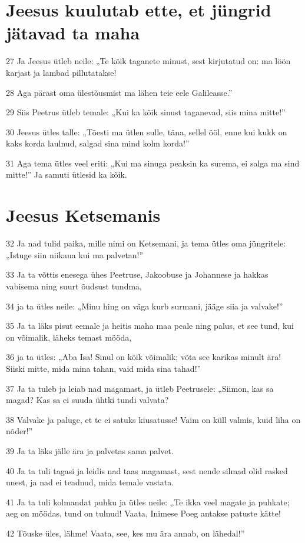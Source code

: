 \section*{Jeesus kuulutab ette, et jüngrid jätavad ta maha}

\par 27 Ja Jeesus ütleb neile: „Te kõik taganete minust, sest kirjutatud on: ma löön karjast ja lambad pillutatakse!
\par 28 Aga pärast oma ülestõusmist ma lähen teie eele Galileasse.”
\par 29 Siis Peetrus ütleb temale: „Kui ka kõik sinust taganevad, siis mina mitte!”
\par 30 Jeesus ütles talle: „Tõesti ma ütlen sulle, täna, sellel ööl, enne kui kukk on kaks korda laulnud, salgad sina mind kolm korda!”
\par 31 Aga tema ütles veel eriti: „Kui ma sinuga peaksin ka surema, ei salga ma sind mitte!” Ja samuti ütlesid ka kõik.

\section*{Jeesus Ketsemanis}

\par 32 Ja nad tulid paika, mille nimi on Ketsemani, ja tema ütles oma jüngritele: „Istuge siin niikaua kui ma palvetan!”
\par 33 Ja ta võttis enesega ühes Peetruse, Jakoobuse ja Johannese ja hakkas vabisema ning suurt õudsust tundma,
\par 34 ja ta ütles neile: „Minu hing on väga kurb surmani, jääge siia ja valvake!”
\par 35 Ja ta läks pisut eemale ja heitis maha maa peale ning palus, et see tund, kui on võimalik, läheks temast mööda,
\par 36 ja ta ütles: „Aba Isa! Sinul on kõik võimalik; võta see karikas minult ära! Siiski mitte, mida mina tahan, vaid mida sina tahad!”
\par 37 Ja ta tuleb ja leiab nad magamast, ja ütleb Peetrusele: „Siimon, kas sa magad? Kas sa ei suuda ühtki tundi valvata?
\par 38 Valvake ja paluge, et te ei satuks kiusatusse! Vaim on küll valmis, kuid liha on nõder!”
\par 39 Ja ta läks jälle ära ja palvetas sama palvet.
\par 40 Ja ta tuli tagasi ja leidis nad taas magamast, sest nende silmad olid rasked unest, ja nad ei teadnud, mida temale vastata.
\par 41 Ja ta tuli kolmandat puhku ja ütles neile: „Te ikka veel magate ja puhkate; aeg on möödas, tund on tulnud! Vaata, Inimese Poeg antakse patuste kätte!
\par 42 Tõuske üles, lähme! Vaata, see, kes mu ära annab, on lähedal!”

